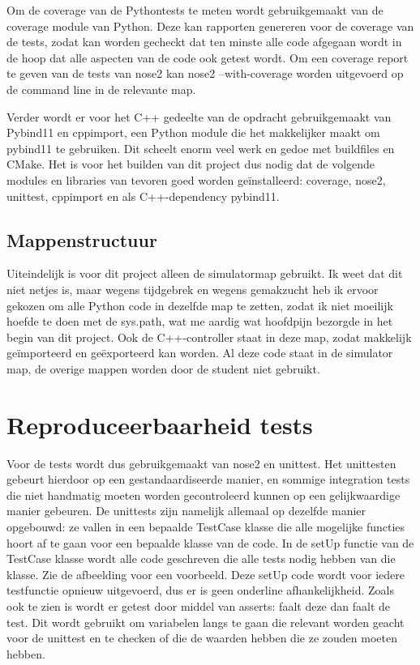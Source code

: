\documentclass{article}
\begin{document}
    Om de coverage van de Pythontests te meten wordt gebruikgemaakt van de coverage module van Python. Deze kan rapporten genereren voor de coverage van de tests, zodat kan worden gecheckt dat ten minste alle code afgegaan wordt in de hoop dat alle aspecten van de code ook getest wordt. Om een coverage report te geven van de tests van nose2 kan nose2 --with-coverage worden uitgevoerd op de command line in de relevante map.
    
    Verder wordt er voor het C++ gedeelte van de opdracht gebruikgemaakt van Pybind11 en cppimport, een Python module die het makkelijker maakt om pybind11 te gebruiken. Dit scheelt enorm veel werk en gedoe met buildfiles en CMake. Het is voor het builden van dit project dus nodig dat de volgende modules en libraries van tevoren goed worden ge\"installeerd: coverage, nose2, unittest, cppimport en als C++-dependency pybind11.
    
    \subsection{Mappenstructuur}
    Uiteindelijk is voor dit project alleen de simulatormap gebruikt. Ik weet dat dit niet netjes is, maar wegens tijdgebrek en wegens gemakzucht heb ik ervoor gekozen om alle Python code in dezelfde map te zetten, zodat ik niet moeilijk hoefde te doen met de sys.path, wat me aardig wat hoofdpijn bezorgde in het begin van dit project. Ook de C++-controller staat in deze map, zodat makkelijk ge\"importeerd en ge\"exporteerd kan worden. Al deze code staat in de simulator map, de overige mappen worden door de student niet gebruikt.
    
    \section{Reproduceerbaarheid tests}
    Voor de tests wordt dus gebruikgemaakt van nose2 en unittest. Het unittesten gebeurt hierdoor op een gestandaardiseerde manier, en sommige integration tests die niet handmatig moeten worden gecontroleerd kunnen op een gelijkwaardige manier gebeuren. De unittests zijn namelijk allemaal op dezelfde manier opgebouwd: ze vallen in een bepaalde TestCase klasse die alle mogelijke functies hoort af te gaan voor een bepaalde klasse van de code. In de setUp functie van de TestCase klasse wordt alle code geschreven die alle tests nodig hebben van die klasse. Zie de afbeelding voor een voorbeeld. Deze setUp code wordt voor iedere testfunctie opnieuw uitgevoerd, dus er is geen onderline afhankelijkheid. Zoals ook te zien is wordt er getest door middel van asserts: faalt deze dan faalt de test. Dit wordt gebruikt om variabelen langs te gaan die relevant worden geacht voor de unittest en te checken of die de waarden hebben die ze zouden moeten hebben.
    
\end{document}
